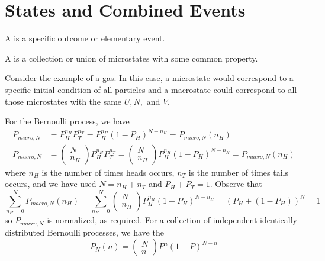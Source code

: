 \documentclass[12pt, a4paper, oneside, openright, titlepage]{book}
\begin{document}
\section{States and Combined Events}

\begin{defn}
    A  is a specific outcome or elementary event.
\end{defn}

\begin{defn}
    A  is a collection or union of microstates with some common property.
\end{defn}

Consider the example of a gas. In this case, a microstate would correspond to a specific initial condition of all particles and a macrostate could correspond to all those microstates with the same $U,N,$ and $V$. 

For the Bernoulli process, we have \begin{align*}
    P_{micro,N} &= P_H^{n_H}P_T^{n_T} = P_H^{n_H}(1-P_H)^{N-n_H} = P_{micro,N}(n_H) \\
    P_{macro, N} &= \begin{pmatrix} N \\ n_H \end{pmatrix}P_H^{n_H}P_T^{n_T} = \begin{pmatrix} N \\ n_H \end{pmatrix}P_H^{n_H}(1-P_H)^{N-n_H} = P_{macro,N}(n_H)
\end{align*}
where $n_H$ is the number of times heads occurs, $n_T$ is the number of times tails occurs, and we have used $N = n_H + n_T$ and $P_H + P_T = 1$. Observe that \begin{equation*}
    \sum_{n_H=0}^NP_{macro,N}(n_H) = \sum_{n_H=0}^N\begin{pmatrix} N \\ n_H \end{pmatrix}P_H^{n_H}(1-P_H)^{N-n_H} = (P_H + (1-P_H))^N = 1
\end{equation*}
so $P_{macro,N}$ is normalized, as required. For a collection of independent identically distributed Bernoulli processes, we have the  \begin{equation*}
    P_N(n) = \begin{pmatrix} N \\ n\end{pmatrix} P^n(1-P)^{N-n}
\end{equation*}
\end{document}
